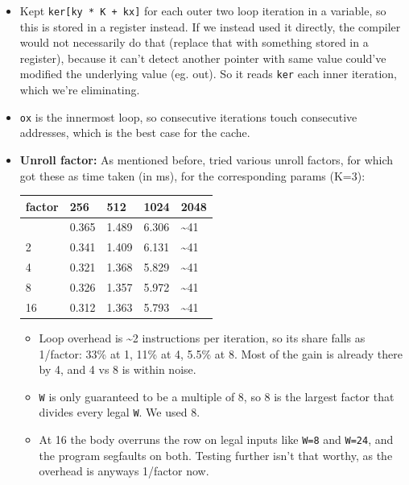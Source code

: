 \documentclass[
  10pt,
]{article}
\newcounter{none} %
\providecommand{\tightlist}{%
  \setlength{\itemsep}{0pt}\setlength{\parskip}{0pt}}
\begin{document}
\begin{itemize}
\item
  Kept \texttt{ker[ky * K + kx]} for each outer two loop iteration in a
  variable, so this is stored in a register instead. If we instead used it
  directly, the compiler would not necessarily do that (replace that with
  something stored in a register), because it can't detect another pointer with
  same value could've modified the underlying value (eg. out). So it reads
  \texttt{ker} each inner iteration, which we're eliminating.

\item
  \texttt{ox} is the innermost loop, so consecutive iterations touch
  consecutive addresses, which is the best case for the cache.

\item
\textbf{Unroll factor:} As mentioned before, tried various unroll factors, for
which got these as time taken (in ms), for the corresponding params (K=3):

{\def\LTcaptype{none} %
\begin{longtable}[]{@{}lllll@{}}
\toprule\noalign{}
factor & 256 & 512 & 1024 & 2048 \\
\midrule\noalign{}
\endhead
\bottomrule\noalign{}
\endlastfoot
1 & 0.365 & 1.489 & 6.306 & \textasciitilde41 \\
2 & 0.341 & 1.409 & 6.131 & \textasciitilde41 \\
4 & 0.321 & 1.368 & 5.829 & \textasciitilde41 \\
8 & 0.326 & 1.357 & 5.972 & \textasciitilde41 \\
16 & 0.312 & 1.363 & 5.793 & \textasciitilde41 \\
\end{longtable}
}

\begin{itemize}
\tightlist
\item
  Loop overhead is \textasciitilde2 instructions per iteration, so its share
  falls as 1/factor: 33\% at 1, 11\% at 4, 5.5\% at 8. Most of the gain is
  already there by 4, and 4 vs 8 is within noise.
\item
  \texttt{W} is only guaranteed to be a multiple of 8, so 8 is the largest
  factor that divides every legal \texttt{W}. We used 8.
\item
  At 16 the body overruns the row on legal inputs like \texttt{W=8} and
  \texttt{W=24}, and the program segfaults on both. Testing further isn't that
  worthy, as the overhead is anyways 1/factor now.
\end{itemize}
\end{itemize}
\end{document}
